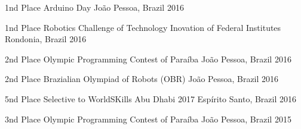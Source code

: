 \begin{cvhonors}
        
 \cvhonor
    {1nd Place} %
    {Arduino Day} %
    {João Pessoa, Brazil} %
    {2016} %

 \cvhonor
    {1nd Place} %
    {Robotics Challenge of Technology Inovation of Federal Institutes} %
    {Rondonia, Brazil} %
    {2016} %

 \cvhonor
    {2nd Place} %
    {Olympic Programming Contest of Paraíba} %
    {João Pessoa, Brazil} %
    {2016} %
    
 \cvhonor
    {2nd Place} %
    {Brazialian Olympiad of Robots (OBR)} %
    {João Pessoa, Brazil} %
    {2016} %
    
    
 \cvhonor
    {5nd Place} %
    {Selective to WorldSKills Abu Dhabi 2017} %
    {Espírito Santo, Brazil} %
    {2016} %
    
    
 \cvhonor
    {3nd Place} %
    {Olympic Programming Contest of Paraíba} %
    {João Pessoa, Brazil} %
    {2015} %

\end{cvhonors}
